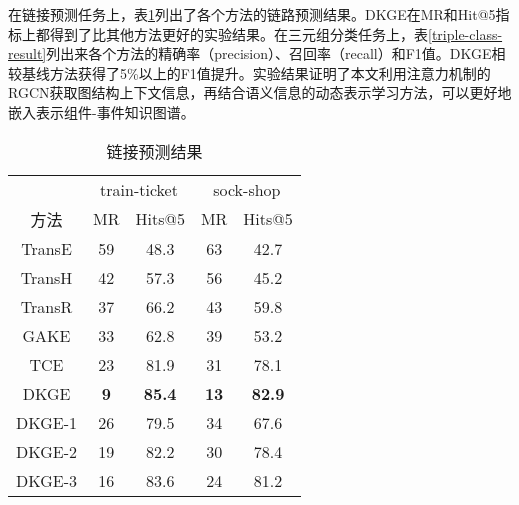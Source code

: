 在链接预测任务上，表\ref{link-predict-result}列出了各个方法的链路预测结果。DKGE在MR和Hit@5指标上都得到了比其他方法更好的实验结果。在三元组分类任务上，表\ref{triple-class-result}列出来各个方法的精确率（precision）、召回率（recall）和F1值。DKGE相较基线方法获得了5\%以上的F1值提升。实验结果证明了本文利用注意力机制的RGCN获取图结构上下文信息，再结合语义信息的动态表示学习方法，可以更好地嵌入表示组件-事件知识图谱。
\begin{table}[htbp]
    \caption{链接预测结果}
    \centering
    \label{link-predict-result}
    \begin{tabular}{ccccc}
    \toprule[1.5pt]
           & \multicolumn{2}{c}{train-ticket} & \multicolumn{2}{c}{sock-shop} \\
    方法     & MR            & Hits@5           & MR           & Hits@5         \\ \midrule[1.5pt]
    TransE & 59            & 48.3             & 63           & 42.7           \\
    TransH & 42            & 57.3             & 56           & 45.2           \\
    TransR & 37            & 66.2             & 43           & 59.8           \\
    GAKE   & 33            & 62.8             & 39           & 53.2           \\
    TCE    & 23            & 81.9             & 31           & 78.1           \\
    DKGE   & \textbf{9}    & \textbf{85.4}    & \textbf{13}  & \textbf{82.9}  \\
    DKGE-1 & 26            & 79.5             & 34           & 67.6         \\ 
    DKGE-2 & 19           & 82.2             & 30           & 78.4           \\ 
    DKGE-3 & 16            & 83.6            & 24           & 81.2          \\ 
    \bottomrule[1.5pt]
    \end{tabular}
\end{table}


